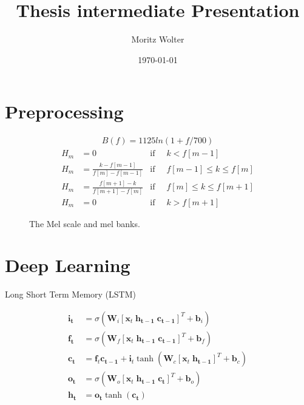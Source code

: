 \documentclass{beamer}
\title{Thesis intermediate Presentation}
\author{Moritz Wolter}
\date{\today}
\begin{document}
\begin{frame}
  \titlepage
\end{frame}



\section{Preprocessing}
\begin{frame}
\begin{align}
	B(f) = 1125 ln(1 + f / 700)
\end{align}
\begin{align}
	H_m &= 0 				   &\text{if}\;\; & k < f[m-1] \\
	H_m &= \frac{k      - f[m-1] }{f[m] - f[m-1]}  &\text{if}\;\; & f[m-1] \leq k \leq f[m] \\
	H_m &= \frac{f[m+1] - k      }{f[m + 1] - f[m]}&\text{if}\;\; & f[m] \leq k \leq f[m+1] \\
	H_m &= 0									   &\text{if}\;\; & k > f[m+1] 
\end{align}
\end{frame}



\begin{frame}
\begin{figure}
	
	
	\caption{The Mel scale and mel banks.}
	\label{fig:melBank}
\end{figure}
\end{frame}


\section{Deep Learning}

\begin{frame}{Long Short Term Memory (LSTM)}

\begin{align}
\mathbf{i_t} &= \sigma (\mathbf{W}_i [\mathbf{x}_t \; \mathbf{h_{t-1}} \; \mathbf{c_{t-1}}]^T + \mathbf{b}_i) \\
\mathbf{f_t} &= \sigma (\mathbf{W}_f [\mathbf{x}_t \; \mathbf{h_{t-1}} \; \mathbf{c_{t-1}}]^T + \mathbf{b}_f) \\
\mathbf{c_t} &= \mathbf{f}_t \mathbf{c_{t-1}} + \mathbf{i}_t \tanh( \mathbf{W}_c [\mathbf{x}_t \; \mathbf{h_{t-1}}]^T + \mathbf{b}_c ) \\
\mathbf{o_t} &= \sigma (\mathbf{W}_o [\mathbf{x}_t \; \mathbf{h_{t-1}} \; \mathbf{c_t}]^T + \mathbf{b}_o ) \\
\mathbf{h_t} &= \mathbf{o_t} \tanh(\mathbf{c_t})
\end{align}

\end{frame}
\end{document}
